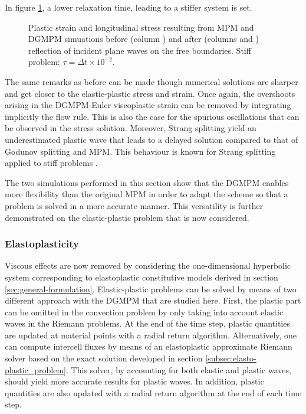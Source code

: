 In figure \ref{fig:siff_elastoviscoplastic_RP}, a lower relaxation time, leading to a stiffer system is set.
\begin{figure}[h!]
  \centering
  { \label{subfig:evp_stiff1}}
  { \label{subfig:evp_stiff2}}
  { \label{subfig:evp_stiff3}}
  {}
  \caption{Plastic strain and longitudinal stress resulting from MPM and DGMPM simuations before (column ) and after (columns  and ) reflection of incident plane waves on the free boundaries. Stiff problem: $\tau=\Delta t \times 10^{-2}$.}
  \label{fig:siff_elastoviscoplastic_RP}
\end{figure}
The same remarks as before can be made though numerical solutions are sharper and get closer to the elastic-plastic stress and strain. Once again, the overshoots arising in the DGMPM-Euler viscoplastic strain can be removed by integrating implicitly the flow rule. This is also the case for the spurious oscillations that can be observed in the stress solution. Moreover, Strang splitting yield an underestimated plastic wave that leads to a delayed solution compared to that of Godunov splitting and MPM. This behaviour is known for Strang splitting applied to stiff problems \cite{Leveque_stiff,Thomas_EVP}.

The two simulations performed in this section show that the DGMPM enables more flexibility than the original MPM in order to adapt the scheme so that a problem is solved in a more accurate manner. This versatility is further demonstrated on the elastic-plastic problem that is now considered.

\subsubsection{Elastoplasticity}
Viscous effects are now removed by considering the one-dimensional hyperbolic system corresponding to elastoplastic constitutive models derived in section \ref{sec:general-formulation}. Elastic-plastic problems can be solved by means of two different approach with the DGMPM that are studied here. First, the plastic part can be omitted in the convection problem by only taking into account elastic waves in the Riemann problems. At the end of the time step, plastic quantities are updated at material points with a radial return algorithm. %
Alternatively, one can compute intercell fluxes by means of an elastoplastic approximate Riemann solver based on the exact solution developed in section \ref{subsec:elasto-plastic_problem}. This solver, by accounting for both elastic and plastic waves, should yield more accurate results for plastic waves. In addition, plastic quantities are also updated with a radial return algorithm at the end of each time step.

